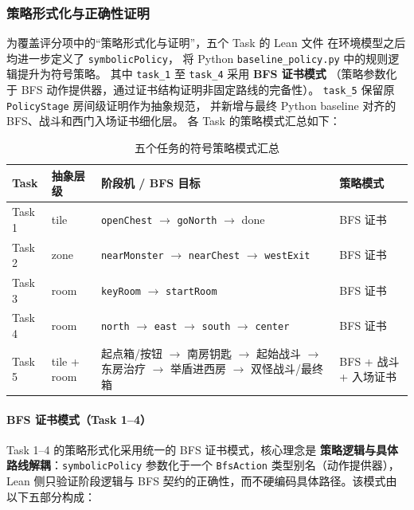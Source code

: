 \documentclass[12pt,a4paper]{ctexart}
\begin{document}
\subsubsection{策略形式化与正确性证明}

为覆盖评分项中的“策略形式化与证明”，五个 Task 的 Lean 文件
在环境模型之后均进一步定义了 \texttt{symbolicPolicy}，
将 Python \texttt{baseline\_policy.py} 中的规则逻辑提升为符号策略。
其中 \texttt{task\_1} 至 \texttt{task\_4} 采用 \textbf{BFS 证书模式}
（策略参数化于 BFS 动作提供器，通过证书结构证明非固定路线的完备性）。
\texttt{task\_5} 保留原 \texttt{PolicyStage} 房间级证明作为抽象规范，
并新增与最终 Python baseline 对齐的 BFS、战斗和西门入场证书细化层。
各 Task 的策略模式汇总如下：

\begin{table}[H]
\centering
\footnotesize
\begin{tabular}{@{}ll>{\raggedright\arraybackslash}p{}l@{}}
\toprule
Task & 抽象层级 & 阶段机 / BFS 目标 & 策略模式 \\
\midrule
Task 1 & tile & \texttt{openChest} $\to$ \texttt{goNorth} $\to$ done & BFS 证书 \\
Task 2 & zone & \texttt{nearMonster} $\to$ \texttt{nearChest} $\to$ \texttt{westExit} & BFS 证书 \\
Task 3 & room & \texttt{keyRoom} $\to$ \texttt{startRoom} & BFS 证书 \\
Task 4 & room & \texttt{north} $\to$ \texttt{east} $\to$ \texttt{south} $\to$ \texttt{center} & BFS 证书 \\
Task 5 & tile + room & 起点箱/按钮 $\to$ 南房钥匙 $\to$ 起始战斗 $\to$ 东房治疗 $\to$ 举盾进西房 $\to$ 双怪战斗/最终箱 & BFS + 战斗 + 入场证书 \\
\bottomrule
\end{tabular}
\caption{五个任务的符号策略模式汇总}
\end{table}

\paragraph{BFS 证书模式（Task 1--4）}
Task 1--4 的策略形式化采用统一的 BFS 证书模式，核心理念是
\textbf{策略逻辑与具体路线解耦}：\texttt{symbolicPolicy} 参数化于一个
\texttt{BfsAction} 类型别名（动作提供器），Lean 侧只验证阶段逻辑与
BFS 契约的正确性，而不硬编码具体路径。该模式由以下五部分构成：
\end{document}
